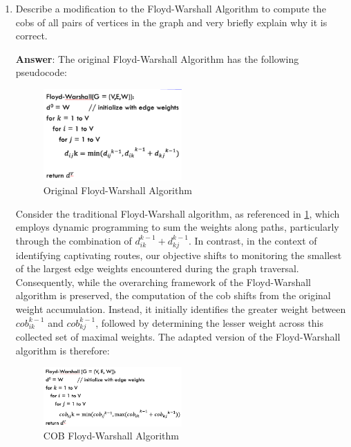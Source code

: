 \documentclass[11pt]{article}
\begin{document}
\begin{enumerate}
\begin{enumerate}

\item Describe a modification to the Floyd-Warshall Algorithm to compute the cobs of all pairs of vertices in the graph and very briefly explain why it is correct.

\textbf{Answer}:
The original Floyd-Warshall Algorithm has the following pseudocode:

\begin{figure}[h]
\centering
    \includegraphics[width=0.5\textwidth]{Floyd-Warshall Algorithm.png}
    \caption{Original Floyd-Warshall Algorithm}
    \label{fig:Floyd-Warshall_Algorithm.}
\end{figure}

Consider the traditional Floyd-Warshall algorithm, as referenced in \ref{fig:Floyd-Warshall_Algorithm.}, which employs dynamic programming to sum the weights along paths, particularly through the combination of $d_{ik}^{k-1}+d_{kj}^{k-1}$. In contrast, in the context of identifying captivating routes, our objective shifts to monitoring the smallest of the largest edge weights encountered during the graph traversal. Consequently, while the overarching framework of the Floyd-Warshall algorithm is preserved, the computation of the cob shifts from the original weight accumulation. Instead, it initially identifies the greater weight between $cob_{ik}^{k-1}$ and $cob_{kj}^{k-1}$, followed by determining the lesser weight across this collected set of maximal weights. The adapted version of the Floyd-Warshall algorithm is therefore:

\begin{figure}[h]
\centering
    \includegraphics[width=0.5\textwidth]{COB Floyd-Warshall Algorithm.png}
    \caption{COB Floyd-Warshall Algorithm}
    \label{fig:COB Floyd-Warshall_Algorithm.}
\end{figure}


\end{enumerate}
\end{enumerate}
\end{document}
